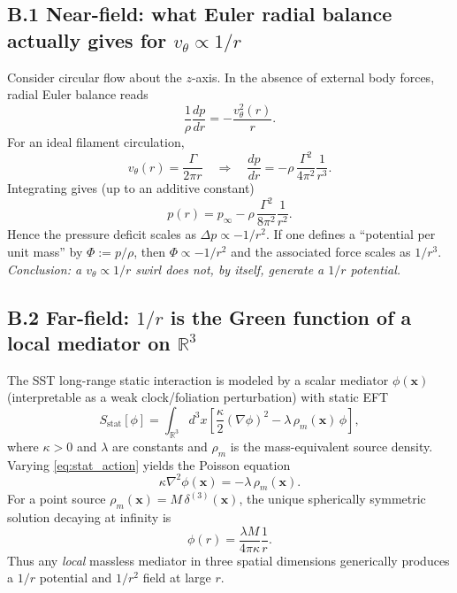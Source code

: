     \subsection*{B.1 Near-field: what Euler radial balance actually gives for $v_\theta\propto 1/r$}
    Consider circular flow about the $z$-axis. In the absence of external body forces, radial Euler balance reads
    \begin{equation}
    \frac{1}{\rho}\frac{dp}{dr}=-\frac{v_\theta^2(r)}{r}.
    \label{eq:euler_radial}
    \end{equation}
    For an ideal filament circulation,
    \begin{equation}
    v_\theta(r)=\frac{\Gamma}{2\pi r}
    \quad\Rightarrow\quad
    \frac{dp}{dr}=-\rho\,\frac{\Gamma^2}{4\pi^2}\frac{1}{r^3}.
    \end{equation}
    Integrating gives (up to an additive constant)
    \begin{equation}
    p(r)=p_\infty-\rho\,\frac{\Gamma^2}{8\pi^2}\frac{1}{r^2}.
    \label{eq:pressure_deficit}
    \end{equation}
    Hence the pressure deficit scales as $\Delta p\propto -1/r^2$.
    If one defines a ``potential per unit mass'' by $\Phi:=p/\rho$, then $\Phi\propto -1/r^2$ and the associated force scales as $1/r^3$.
    \emph{Conclusion: a $v_\theta\propto 1/r$ swirl does not, by itself, generate a $1/r$ potential.}

    \subsection*{B.2 Far-field: $1/r$ is the Green function of a local mediator on $\mathbb{R}^3$}
    The SST long-range static interaction is modeled by a scalar mediator $\phi(\mathbf{x})$
    (interpretable as a weak clock/foliation perturbation) with static EFT
    \begin{equation}
    S_{\mathrm{stat}}[\phi]=\int_{\mathbb{R}^3} d^3x\left[\frac{\kappa}{2}(\nabla\phi)^2-\lambda\,\rho_m(\mathbf{x})\,\phi\right],
    \label{eq:stat_action}
    \end{equation}
    where $\kappa>0$ and $\lambda$ are constants and $\rho_m$ is the mass-equivalent source density.
    Varying \eqref{eq:stat_action} yields the Poisson equation
    \begin{equation}
    \kappa \nabla^2\phi(\mathbf{x})=-\lambda\,\rho_m(\mathbf{x}).
    \label{eq:poisson_phi}
    \end{equation}
    For a point source $\rho_m(\mathbf{x})=M\,\delta^{(3)}(\mathbf{x})$, the unique spherically symmetric solution decaying at infinity is
    \begin{equation}
    \phi(r)=\frac{\lambda M}{4\pi\kappa}\frac{1}{r}.
    \end{equation}
    Thus any \emph{local} massless mediator in three spatial dimensions generically produces a $1/r$ potential and $1/r^2$ field at large $r$.

